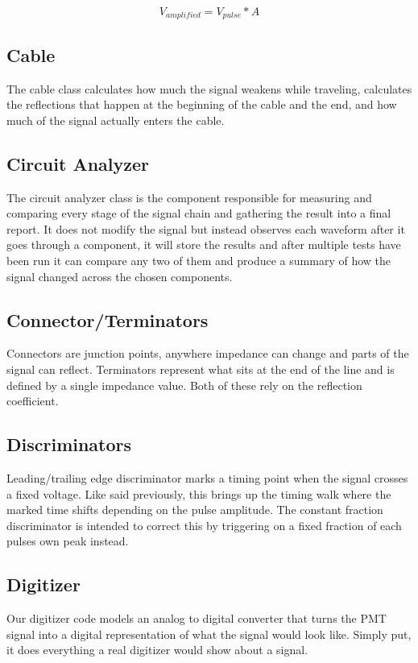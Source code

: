 \documentclass[10pt]{article}
\begin{document}
$$
V_{amplified} = V_{pulse} * A
$$




\subsection{Cable}
The cable class calculates how much the signal weakens while traveling, calculates the reflections that happen at the beginning of the cable and the end, and how much of the signal actually enters the cable.

\subsection{Circuit Analyzer}
The circuit analyzer class is the component responsible for measuring and comparing every stage of the signal chain and gathering the result into a final report. It does not modify the signal but instead observes each waveform after it goes through a component, it will store the results and after multiple tests have been run it can compare any two of them and produce a summary of how the signal changed across the chosen components.

\subsection{Connector/Terminators}
Connectors are junction points, anywhere impedance can change and parts of the signal can reflect. Terminators represent what sits at the end of the line and is defined by a single impedance value. Both of these rely on the reflection coefficient.

\subsection{Discriminators}
Leading/trailing edge discriminator marks a timing point when the signal crosses a fixed voltage. Like said previously, this brings up the timing walk where the marked time shifts depending on the pulse amplitude. The constant fraction discriminator is intended to correct this by triggering on a fixed fraction of each pulses own peak instead.

\subsection{Digitizer}
Our digitizer code models an analog to digital converter that turns the PMT signal into a digital representation of what the signal would look like. Simply put, it does everything a real digitizer would show about a signal.
\end{document}
